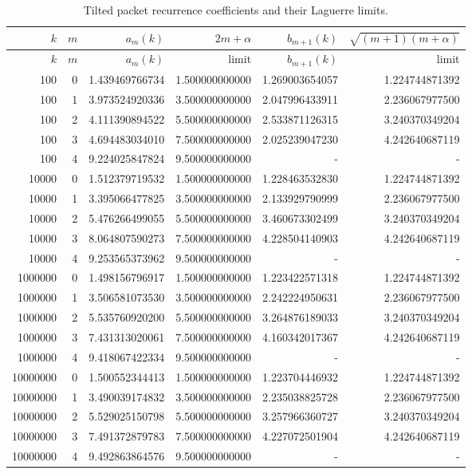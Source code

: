 \begin{longtable}{rrrrrr}
\caption{Tilted packet recurrence coefficients and their Laguerre limits.}\label{tab:recurrence}\\
\toprule
$k$ & $m$ & $a_m(k)$ & $2m+\alpha$ & $b_{m+1}(k)$ & $\sqrt{(m+1)(m+\alpha)}$\\
\midrule
\endfirsthead
\toprule
$k$ & $m$ & $a_m(k)$ & limit & $b_{m+1}(k)$ & limit\\
\midrule
\endhead
100 & 0 & 1.439469766734 & 1.500000000000 & 1.269003654057 & 1.224744871392 \\
100 & 1 & 3.973524920336 & 3.500000000000 & 2.047996433911 & 2.236067977500 \\
100 & 2 & 4.111390894522 & 5.500000000000 & 2.533871126315 & 3.240370349204 \\
100 & 3 & 4.694483034010 & 7.500000000000 & 2.025239047230 & 4.242640687119 \\
100 & 4 & 9.224025847824 & 9.500000000000 & - & - \\
10000 & 0 & 1.512379719532 & 1.500000000000 & 1.228463532830 & 1.224744871392 \\
10000 & 1 & 3.395066477825 & 3.500000000000 & 2.133929790999 & 2.236067977500 \\
10000 & 2 & 5.476266499055 & 5.500000000000 & 3.460673302499 & 3.240370349204 \\
10000 & 3 & 8.064807590273 & 7.500000000000 & 4.228504140903 & 4.242640687119 \\
10000 & 4 & 9.253565373962 & 9.500000000000 & - & - \\
1000000 & 0 & 1.498156796917 & 1.500000000000 & 1.223422571318 & 1.224744871392 \\
1000000 & 1 & 3.506581073530 & 3.500000000000 & 2.242224950631 & 2.236067977500 \\
1000000 & 2 & 5.535760920200 & 5.500000000000 & 3.264876189033 & 3.240370349204 \\
1000000 & 3 & 7.431313020061 & 7.500000000000 & 4.160342017367 & 4.242640687119 \\
1000000 & 4 & 9.418067422334 & 9.500000000000 & - & - \\
10000000 & 0 & 1.500552344413 & 1.500000000000 & 1.223704446932 & 1.224744871392 \\
10000000 & 1 & 3.490039174832 & 3.500000000000 & 2.235038825728 & 2.236067977500 \\
10000000 & 2 & 5.529025150798 & 5.500000000000 & 3.257966360727 & 3.240370349204 \\
10000000 & 3 & 7.491372879783 & 7.500000000000 & 4.227072501904 & 4.242640687119 \\
10000000 & 4 & 9.492863864576 & 9.500000000000 & - & - \\
\bottomrule
\end{longtable}
